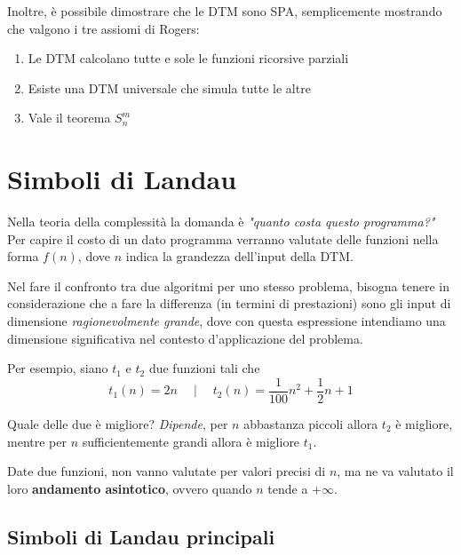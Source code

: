 Inoltre, è possibile dimostrare che le DTM sono SPA, semplicemente mostrando che valgono i tre assiomi di Rogers: 
\begin{enumerate}
	\item Le DTM calcolano tutte e sole le funzioni ricorsive parziali
     
	\item Esiste una DTM universale che simula tutte le altre
	
    \item Vale il teorema $S^m_n$
\end{enumerate}

\section{Simboli di Landau}

Nella teoria della complessità la domanda è \textit{"quanto costa questo programma?"} Per capire il costo di un dato programma verranno valutate delle funzioni nella forma $f(n)$, dove $n$ indica la grandezza dell'input della DTM. 

Nel fare il confronto tra due algoritmi per uno stesso problema, bisogna tenere in considerazione che a fare la differenza (in termini di prestazioni) sono gli input di dimensione \textit{ragionevolmente grande}, dove con questa espressione intendiamo una dimensione significativa nel contesto d'applicazione del problema.

Per esempio, siano $t_1$ e $t_2$ due funzioni tali che
$$ t_1 (n) = 2n \quad \mid \quad t_2 (n) = \frac{1}{100} n^2 + \frac{1}{2}n + 1 $$

Quale delle due è migliore? \textit{Dipende}, per $n$ abbastanza piccoli allora $t_2$ è migliore, mentre per $n$ sufficientemente grandi allora è migliore $t_1$.

Date due funzioni, non vanno valutate per valori precisi di $n$, ma ne va valutato il loro \textbf{andamento asintotico}, ovvero quando $n$ tende a $+ \infty$.

\subsection{Simboli di Landau principali}

